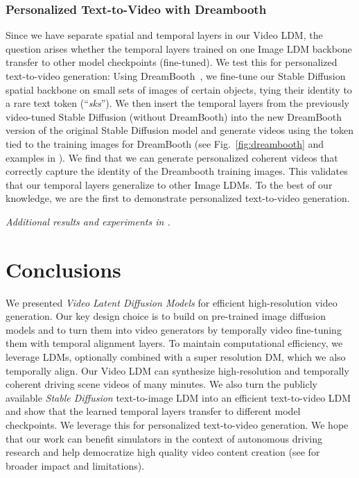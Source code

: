 \vspace{-3mm}
\subsubsection{Personalized Text-to-Video with Dreambooth} \label{sec:dreambooth}
\vspace{-1mm}
Since we have separate spatial and temporal layers in our Video LDM, the question arises whether the temporal layers trained on one Image LDM backbone transfer to other model checkpoints (\eg fine-tuned). 
We test this for personalized text-to-video generation: Using DreamBooth~\cite{ruiz2022dreambooth}, we fine-tune our Stable Diffusion spatial backbone on small sets of images of certain objects, tying their identity to a rare text token (``\emph{sks}''). We then insert the temporal layers from the previously video-tuned Stable Diffusion (without DreamBooth) into the new DreamBooth version of the original Stable Diffusion model and generate videos using the token tied to the training images for DreamBooth (see Fig.~\ref{fig:dreambooth} and examples in ). We find that we can generate personalized coherent videos that correctly capture the identity of the Dreambooth training images. This validates that our temporal layers generalize to other Image LDMs. To the best of our knowledge, we are the first to demonstrate personalized text-to-video generation.

\textit{Additional results and experiments in .}

\vspace{-1.7mm}
\section{Conclusions}\label{sec:conclusions}
 \vspace{-1.7mm}
We presented \textit{Video Latent Diffusion Models} for efficient high-resolution video generation. Our key design choice is to build on pre-trained image diffusion models and to turn them into video generators by temporally video fine-tuning them with temporal alignment layers. To maintain computational efficiency, we leverage LDMs, optionally combined with a super resolution DM, which we also temporally align. Our Video LDM can synthesize high-resolution and temporally coherent driving scene videos of many minutes. We also turn the publicly available \textit{Stable Diffusion} text-to-image LDM into an efficient text-to-video LDM and show that the learned temporal layers transfer to different model checkpoints. We leverage this for personalized text-to-video generation. We hope that our work can benefit simulators in the context of autonomous driving research and 
help democratize high quality video content creation (see  for broader impact and limitations).

{\small
{}
}

\newpage

